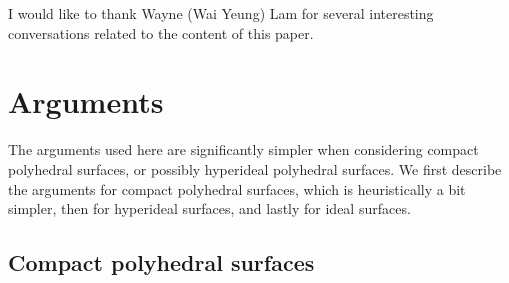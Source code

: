 \documentclass[notitlepage,twoside,a4paper]{amsart}
\theoremstyle{named}
\begin{document}
I would like to thank Wayne (Wai Yeung) Lam for several interesting conversations related to the content of this paper.

\section{Arguments}

The arguments used here are significantly simpler when considering compact polyhedral surfaces, or possibly hyperideal polyhedral surfaces. We first describe the arguments for compact polyhedral surfaces, which is heuristically a bit simpler, then for hyperideal surfaces, and lastly for ideal surfaces. 

\subsection{Compact polyhedral surfaces}
\end{document}
